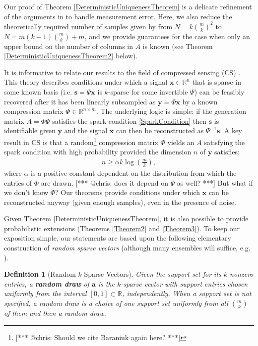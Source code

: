 \documentclass[journal, onecolumn]{IEEEtran}
\newtheorem{definition}{Definition}
\begin{document}
Our proof of Theorem \ref{DeterministicUniquenessTheorem} is a delicate refinement of the arguments in \cite{Hillar15} to handle measurement error.  Here, we also reduce the theoretically required number of samples given by \cite{Hillar15} from $N=k{m \choose k}^2$ to $N = m(k-1){m \choose k}+m$, and we provide guarantees for the case when only an upper bound on the number of columns in $A$ is known (see Theorem \ref{DeterministicUniquenessTheorem2} below). 

It is informative to relate our results to the field of compressed sensing (CS) \cite{candes2006near, donoho2006compressed, candes2006stable}. This theory describes conditions under which a signal $\mathbf{x} \in \mathbb{R}^n$ that is sparse in some known basis (i.e. $\mathbf{s} = \Psi \mathbf{x}$ is $k$-sparse for some invertible $\Psi$) can be feasibly recovered after it has been linearly subsampled as $\mathbf{y} = \Phi \mathbf{x}$ by a known compression matrix $\Phi \in \mathbb{R}^{n \times m}$. The underlying logic is simple: if the generation matrix $A = \Phi\Psi$ satisfies the spark condition \eqref{SparkCondition} then $\mathbf{s}$ is identifiable given $\mathbf{y}$ and the signal $\mathbf{x}$ can then be reconstructed as $\Psi^{-1}\mathbf{s}$. A key result in CS is that a random\footnote{[*** @chris: Should we cite Baraniuk again here? ***]} compression matrix $\Phi$ yields an $A$ satisfying the spark condition with high probability provided the dimension $n$ of $\mathbf{y}$ satisfies:
\begin{align}\label{CScondition}
n \geq \alpha k\log\left(\frac{m}{k}\right),
\end{align}
where $\alpha$ is a positive constant dependent on the distribution from which the entries of $\Phi$ are drawn. [*** @chris: does it depend on $\Psi$ as well? ***] But what if we don't know $\Phi$? Our theorems provide conditions under which $\mathbf{x}$ can be reconstructed anyway (given enough samples), even in the presence of noise. 

Given Theorem \ref{DeterministicUniquenessTheorem}, it is also possible to provide probabilistic extensions (Theorems \ref{Theorem2} and \ref{Theorem3}).  To keep our exposition simple, our statements are based upon the following elementary construction of \emph{random sparse vectors} (although many ensembles will suffice, e.g. \cite[Sec.~\S 4]{baraniuk2008simple}).

\begin{definition}[Random $k$-Sparse Vectors]\label{RandomDraw}
Given the support set for its $k$ nonzero entries, a \textbf{random draw} of $\mathbf{a}$ is the $k$-sparse vector with support entries chosen uniformly from the interval $[0, 1] \subset \mathbb{R}$, independently. When a support set is not specified, a random draw is a choice of one support set uniformly from all ${m \choose k}$ of them and then a random draw.
\end{definition}
\end{document}
